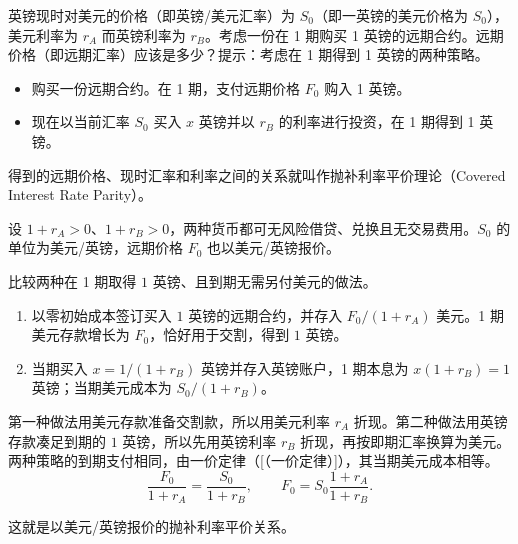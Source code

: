 \begin{problem}
 英镑现时对美元的价格（即英镑/美元汇率）为 $S_{0}$（即一英镑的美元价格为 $S_{0}$），美元利率为 $r_{A}$ 而英镑利率为 $r_{B}$。考虑一份在 1 期购买 1 英镑的远期合约。远期价格（即远期汇率）应该是多少？提示：考虑在 1 期得到 1 英镑的两种策略。
\begin{itemize}
    \item 购买一份远期合约。在 1 期，支付远期价格 $F_{0}$ 购入 1 英镑。
    \item 现在以当前汇率 $S_{0}$ 买入 $x$ 英镑并以 $r_{B}$ 的利率进行投资，在 1 期得到 1 英镑。
\end{itemize}
得到的远期价格、现时汇率和利率之间的关系就叫作抛补利率平价理论（Covered Interest Rate Parity）。
\end{problem}
\begin{solution}[blank-type=manual,blank-vsep=9\baselineskip]
设 $1+r_A>0$、$1+r_B>0$，两种货币都可无风险借贷、兑换且无交易费用。$S_0$ 的单位为美元/英镑，远期价格 $F_0$ 也以美元/英镑报价。

比较两种在 1 期取得 $1$ 英镑、且到期无需另付美元的做法。
\begin{enumerate}
    \item 以零初始成本签订买入 $1$ 英镑的远期合约，并存入 $F_0/(1+r_A)$ 美元。1 期美元存款增长为 $F_0$，恰好用于交割，得到 $1$ 英镑。
    \item 当期买入 $x=1/(1+r_B)$ 英镑并存入英镑账户，1 期本息为 $x(1+r_B)=1$ 英镑；当期美元成本为 $S_0/(1+r_B)$。
\end{enumerate}
第一种做法用美元存款准备交割款，所以用美元利率 $r_A$ 折现。第二种做法用英镑存款凑足到期的 $1$ 英镑，所以先用英镑利率 $r_B$ 折现，再按即期汇率换算为美元。两种策略的到期支付相同，由一价定律\ifdefined\WJHandoutKnowledge（[（一价定律）]）\fi，其当期美元成本相等。
\[
    \frac{F_0}{1+r_A}=\frac{S_0}{1+r_B},\qquad
    F_0=S_0\frac{1+r_A}{1+r_B}.
\]

这就是以美元/英镑报价的抛补利率平价关系。
\end{solution}

